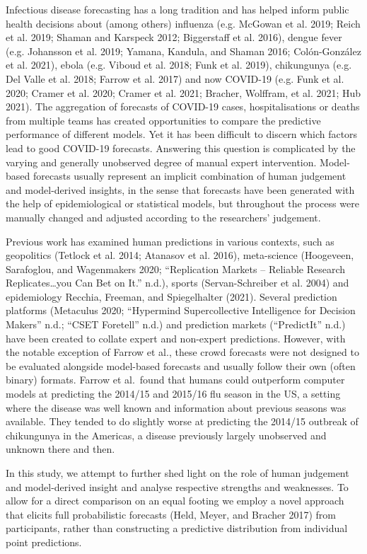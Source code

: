 \documentclass[
]{article}
\begin{document}
Infectious disease forecasting has a long tradition and has helped inform public health decisions about (among others) influenza (e.g. McGowan et al. 2019; Reich et al. 2019; Shaman and Karspeck 2012; Biggerstaff et al. 2016), dengue fever (e.g. Johansson et al. 2019; Yamana, Kandula, and Shaman 2016; Colón-González et al. 2021), ebola (e.g. Viboud et al. 2018; Funk et al. 2019), chikungunya (e.g. Del Valle et al. 2018; Farrow et al. 2017) and now COVID-19 (e.g. Funk et al. 2020; Cramer et al. 2020; Cramer et al. 2021; Bracher, Wolffram, et al. 2021; Hub 2021). The aggregation of forecasts of COVID-19 cases, hospitalisations or deaths from multiple teams has created opportunities to compare the predictive performance of different models. Yet it has been difficult to discern which factors lead to good COVID-19 forecasts. Answering this question is complicated by the varying and generally unobserved degree of manual expert intervention. Model-based forecasts usually represent an implicit combination of human judgement and model-derived insights, in the sense that forecasts have been generated with the help of epidemiological or statistical models, but throughout the process were manually changed and adjusted according to the researchers' judgement.

Previous work has examined human predictions in various contexts, such as geopolitics (Tetlock et al. 2014; Atanasov et al. 2016), meta-science (Hoogeveen, Sarafoglou, and Wagenmakers 2020; {``Replication {Markets} -- {Reliable} Research Replicates\ldots you Can Bet on It.''} n.d.), sports (Servan-Schreiber et al. 2004) and epidemiology Recchia, Freeman, and Spiegelhalter (2021). Several prediction platforms (Metaculus 2020; {``Hypermind \textbar{} {Supercollective} Intelligence for Decision Makers''} n.d.; {``{CSET Foretell}''} n.d.) and prediction markets ({``{PredictIt}''} n.d.) have been created to collate expert and non-expert predictions. However, with the notable exception of Farrow et al., these crowd forecasts were not designed to be evaluated alongside model-based forecasts and usually follow their own (often binary) formats. Farrow et al.~found that humans could outperform computer models at predicting the 2014/15 and 2015/16 flu season in the US, a setting where the disease was well known and information about previous seasons was available. They tended to do slightly worse at predicting the 2014/15 outbreak of chikungunya in the Americas, a disease previously largely unobserved and unknown there and then.

In this study, we attempt to further shed light on the role of human judgement and model-derived insight and analyse respective strengths and weaknesses. To allow for a direct comparison on an equal footing we employ a novel approach that elicits full probabilistic forecasts (Held, Meyer, and Bracher 2017) from participants, rather than constructing a predictive distribution from individual point predictions.
\end{document}
